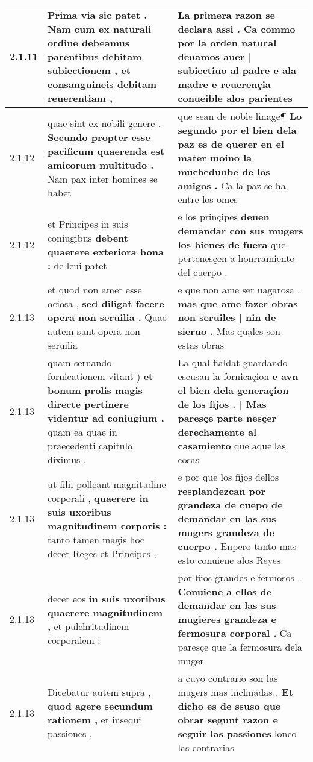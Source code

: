 \begin{tabular}{|p{1cm}|p{6.5cm}|p{6.5cm}|}
2.1.11 & Prima via sic patet . \textbf{ Nam cum ex naturali ordine debeamus parentibus debitam subiectionem , } et consanguineis debitam reuerentiam , & La primera razon se declara assi . \textbf{ Ca commo por la orden natural deuamos auer | subiectiuo al padre e ala madre } e reuerençia conueible alos parientes \\\hline
2.1.12 & quae sint ex nobili genere . \textbf{ Secundo propter esse pacificum quaerenda est amicorum multitudo . } Nam pax inter homines se habet & que sean de noble linage¶ \textbf{ Lo segundo por el bien dela paz es de querer en el mater moino la muchedunbe de los amigos . } Ca la paz se ha entre los omes \\\hline
2.1.12 & et Principes in suis coniugibus \textbf{ debent quaerere exteriora bona : } de leui patet & e los prinçipes \textbf{ deuen demandar con sus mugers los bienes de fuera } que pertenesçen a honrramiento del cuerpo . \\\hline
2.1.13 & et quod non amet esse ociosa , \textbf{ sed diligat facere opera non seruilia . } Quae autem sunt opera non seruilia & e que non ame ser uagarosa . \textbf{ mas que ame fazer obras non seruiles | nin de sieruo . } Mas quales son estas obras \\\hline
2.1.13 & quam seruando fornicationem vitant ) \textbf{ et bonum prolis magis directe pertinere videntur ad coniugium , } quam ea quae in praecedenti capitulo diximus . & La qual fialdat guardando escusan la fornicaçion \textbf{ e avn el bien dela generaçion de los fijos . | Mas paresçe parte nesçer derechamente al casamiento } que aquellas cosas \\\hline
2.1.13 & ut filii polleant magnitudine corporali , \textbf{ quaerere in suis uxoribus magnitudinem corporis : } tanto tamen magis hoc decet Reges et Principes , & e por que los fijos dellos \textbf{ resplandezcan por grandeza de cuepo de demandar en las sus mugers grandeza de cuerpo . } Enpero tanto mas esto conuiene alos Reyes \\\hline
2.1.13 & decet eos \textbf{ in suis uxoribus quaerere magnitudinem , } et pulchritudinem corporalem : & por fiios grandes e fermosos . \textbf{ Conuiene a ellos de demandar en las sus mugieres grandeza e fermosura corporal . } Ca paresçe que la fermosura dela muger \\\hline
2.1.13 & Dicebatur autem supra , \textbf{ quod agere secundum rationem , } et insequi passiones , & a cuyo contrario son las mugers mas inclinadas . \textbf{ Et dicho es de ssuso que obrar segunt razon e seguir las passiones } lonco las contrarias \\\hline

\end{tabular}
